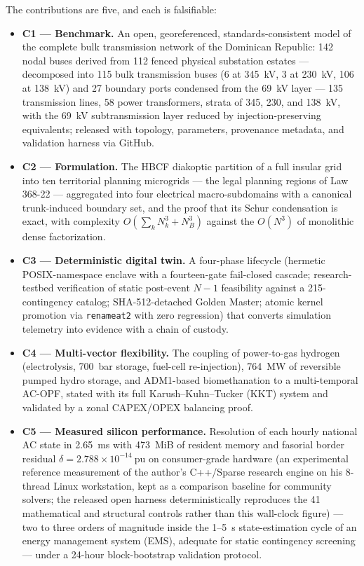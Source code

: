 The contributions are five, and each is falsifiable:
\begin{itemize}
\item \textbf{C1 --- Benchmark.} An open, georeferenced, standards-consistent model of the complete bulk transmission network of the Dominican Republic: 142 nodal buses derived from 112 fenced physical substation estates --- decomposed into 115 bulk transmission buses (6 at 345~kV, 3 at 230~kV, 106 at 138~kV) and 27 boundary ports condensed from the 69~kV layer --- 135 transmission lines, 58 power transformers, strata of 345, 230, and 138~kV, with the 69~kV subtransmission layer reduced by injection-preserving equivalents; released with topology, parameters, provenance metadata, and validation harness via GitHub.
\item \textbf{C2 --- Formulation.} The HBCF diakoptic partition of a full insular grid into ten territorial planning microgrids --- the legal planning regions of Law 368-22 --- aggregated into four electrical macro-subdomains with a canonical trunk-induced boundary set, and the proof that its Schur condensation is exact, with complexity $O(\sum_k N_k^3 + N_B^3)$ against the $O(N^3)$ of monolithic dense factorization.
\item \textbf{C3 --- Deterministic digital twin.} A four-phase lifecycle (hermetic POSIX-namespace enclave with a fourteen-gate fail-closed cascade; research-testbed verification of static post-event $N-1$ feasibility against a 215-contingency catalog; SHA-512-detached Golden Master; atomic kernel promotion via \texttt{renameat2} with zero regression) that converts simulation telemetry into evidence with a chain of custody.
\item \textbf{C4 --- Multi-vector flexibility.} The coupling of power-to-gas hydrogen (electrolysis, 700~bar storage, fuel-cell re-injection), 764~MW of reversible pumped hydro storage, and ADM1-based biomethanation to a multi-temporal AC-OPF, stated with its full Karush--Kuhn--Tucker (KKT) system and validated by a zonal CAPEX/OPEX balancing proof.
\item \textbf{C5 --- Measured silicon performance.} Resolution of each hourly national AC state in 2.65~ms with 473~MiB of resident memory and fasorial border residual $\delta = 2.788 \times 10^{-14}\ \mathrm{pu}$ on consumer-grade hardware (an experimental reference measurement of the author's C++/Sparse research engine on his 8-thread Linux workstation, kept as a comparison baseline for community solvers; the released open harness deterministically reproduces the 41 mathematical and structural controls rather than this wall-clock figure) --- two to three orders of magnitude inside the 1--5~s state-estimation cycle of an energy management system (EMS), adequate for static contingency screening --- under a 24-hour block-bootstrap validation protocol.
\end{itemize}

